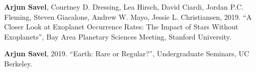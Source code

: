 \documentclass[letterpaper,10.5pt]{article}
\newcommand{\shorterSection}[1]{\vspace{-10pt}\section{#1}}
\begin{document}
\begin{list}{}{\cvlist}
\item[{\color{numcolor}\scriptsize2}] \textbf{Arjun Savel}, Courtney D. Dressing, Lea Hirsch, David Ciardi, Jordan P.C. Fleming, Steven Giacalone, Andrew W. Mayo, Jessie L. Christiansen, 2019. “A Closer Look at Exoplanet Occurrence Rates: The Impact of Stars Without Exoplanets”, Bay Area Planetary Sciences Meeting, Stanford University.

\item[{\color{numcolor}\scriptsize1}] \textbf{Arjun Savel}, 2019. “Earth: Rare or Regular?”, Undergraduate Seminars, UC Berkeley.

\end{list}



\end{document}
